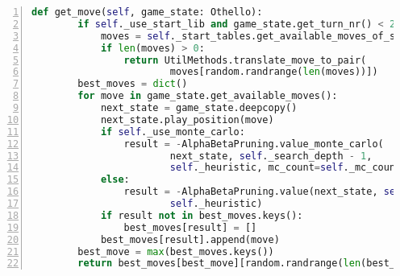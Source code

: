 \begin{lstlisting}[basicstyle=\footnotesize,caption = {get\_move Funktion des \abp -Agenten}, language = python, captionpos = t , numbers=left, label={lst:ab-get-move}]
    def get_move(self, game_state: Othello):
        if self._use_start_lib and game_state.get_turn_nr() < 21:
            moves = self._start_tables.get_available_moves_of_start_tables(game_state)
            if len(moves) > 0:
                return UtilMethods.translate_move_to_pair(
                		moves[random.randrange(len(moves))])
        best_moves = dict()
        for move in game_state.get_available_moves():
            next_state = game_state.deepcopy()
            next_state.play_position(move)
            if self._use_monte_carlo:
                result = -AlphaBetaPruning.value_monte_carlo(
                		next_state, self._search_depth - 1, 
                		self._heuristic, mc_count=self._mc_count)
            else:
                result = -AlphaBetaPruning.value(next_state, self._search_depth - 1, 
                		self._heuristic)
            if result not in best_moves.keys():
                best_moves[result] = []
            best_moves[result].append(move)
        best_move = max(best_moves.keys())
        return best_moves[best_move][random.randrange(len(best_moves[best_move]))]
\end{lstlisting}
